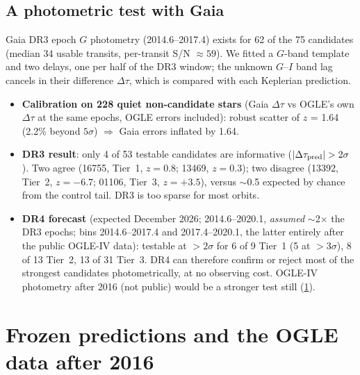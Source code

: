 \documentclass[11pt]{article}
\begin{document}
\subsection{A photometric test with Gaia}
Gaia DR3 epoch $G$ photometry (2014.6--2017.4) exists for 62 of the 75 candidates (median 34 usable transits, per-transit
S/N $\approx59$). We fitted a $G$-band template and two delays, one per half of the DR3 window; the unknown $G$--$I$ band lag
cancels in their difference $\Delta\tau$, which is compared with each Keplerian prediction.
\begin{itemize}[leftmargin=*]
\item \textbf{Calibration on 228 quiet non-candidate stars} (Gaia $\Delta\tau$ vs OGLE's own $\Delta\tau$ at the same epochs, OGLE
errors included): robust scatter of $z$ = 1.64 (2.2\% beyond $5\sigma$) $\Rightarrow$ Gaia errors inflated by 1.64.
\item \textbf{DR3 result}: only 4 of 53 testable candidates are informative ($|\Delta\tau_{\rm pred}|>2\sigma$). Two agree
(16755, Tier~1, $z=0.8$; 13469, $z=0.3$); two disagree (13392, Tier~2, $z=-6.7$; 01106, Tier~3, $z=+3.5$), versus $\sim$0.5 expected
by chance from the control tail. DR3 is too sparse for most orbits.
\item \textbf{DR4 forecast} (expected December 2026; 2014.6--2020.1, \emph{assumed} $\sim$2$\times$ the DR3 epochs; bins 2014.6--2017.4
and 2017.4--2020.1, the latter entirely after the public OGLE-IV data): testable at $>2\sigma$ for 6 of 9 Tier~1 (5 at $>3\sigma$),
8 of 13 Tier~2, 13 of 31 Tier~3. DR4 can therefore confirm or reject most of the strongest candidates photometrically, at no
observing cost. OGLE-IV photometry after 2016 (not public) would be a stronger test still (\cref{sec:pred}).
\end{itemize}

\section{Frozen predictions and the OGLE data after 2016}\label{sec:pred}
\end{document}
